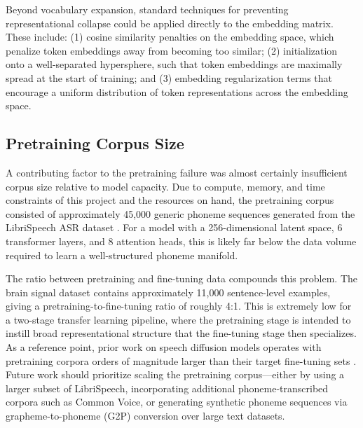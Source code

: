 \documentclass{article}
\begin{document}
Beyond vocabulary expansion, standard techniques for preventing representational collapse
could be applied directly to the embedding matrix. These include: (1) cosine similarity
penalties on the embedding space, which penalize token embeddings away
from becoming too similar; (2) initialization onto a well-separated hypersphere, such
that token embeddings are maximally spread at the start of training; and (3)
embedding regularization terms that encourage a uniform distribution of token
representations across the embedding space. 


\subsection{Pretraining Corpus Size}

A contributing factor to the pretraining failure was almost certainly insufficient
corpus size relative to model capacity. Due to compute, memory, and time constraints of this project and the resources on hand,
the pretraining corpus consisted of approximately 45{,}000 generic phoneme sequences
generated from the LibriSpeech ASR dataset \citep{panayotov2015librispeech}. For a model
with a 256-dimensional latent space, 6 transformer layers, and 8 attention heads, this
is likely far below the data volume required to learn a well-structured phoneme manifold.

The ratio between pretraining and fine-tuning data compounds this problem. The brain
signal dataset contains approximately 11{,}000 sentence-level examples, giving a
pretraining-to-fine-tuning ratio of roughly 4:1. This is extremely low for a two-stage
transfer learning pipeline, where the pretraining stage is intended to instill broad
representational structure that the fine-tuning stage then specializes. As a reference
point, prior work on speech diffusion models operates with pretraining corpora orders
of magnitude larger than their target fine-tuning sets \citep{shen2023naturalspeech}.
Future work should prioritize scaling the pretraining corpus---either by using a larger
subset of LibriSpeech, incorporating additional phoneme-transcribed corpora such as
Common Voice, or generating synthetic phoneme sequences via grapheme-to-phoneme (G2P)
conversion over large text datasets.
\end{document}
